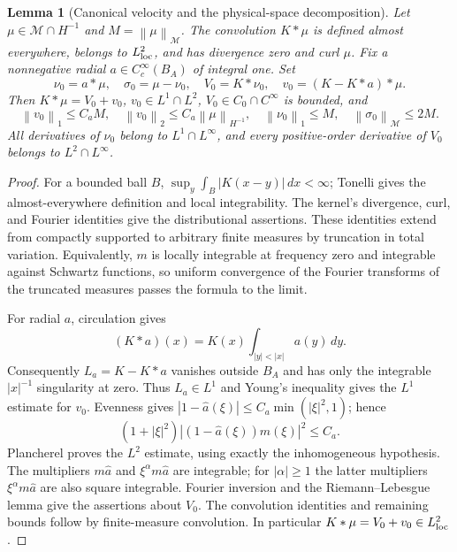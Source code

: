 \documentclass[11pt]{article}
\newtheorem{lemma}[theorem]{Lemma}
\theoremstyle{remark}\newtheorem{remark}[theorem]{Remark}
\newcommand{\M}{\mathcal M}
\newcommand{\norm}[2]{\left\|#1\right\|_{#2}}
\newcommand{\dd}{\,dx}
\begin{document}
\begin{lemma}[Canonical velocity and the physical-space decomposition]\label{lem:decomp}
Let $\mu\in\M\cap H^{-1}$ and $M=\norm\mu\M$. The convolution $K*\mu$
is defined almost everywhere, belongs to $L^2_{\rm loc}$, and has divergence
zero and curl $\mu$. Fix a nonnegative radial $a\in C_c^\infty(B_A)$ of
integral one. Set
\[
 \nu_0=a*\mu,\quad \sigma_0=\mu-\nu_0,\quad
 V_0=K*\nu_0,\quad v_0=(K-K*a)*\mu.
\]
Then $K*\mu=V_0+v_0$, $v_0\in L^1\cap L^2$, $V_0\in C_0\cap C^\infty$
is bounded, and
\[
 \norm{v_0}1\leq C_aM,\quad
 \norm{v_0}2\leq C_a\norm\mu{H^{-1}},\quad
 \norm{\nu_0}1\leq M,\quad \norm{\sigma_0}\M\leq2M.
\]
All derivatives of $\nu_0$ belong to $L^1\cap L^\infty$, and every
positive-order derivative of $V_0$ belongs to $L^2\cap L^\infty$.
\end{lemma}
\begin{proof}
For a bounded ball $B$, $\sup_y\int_B|K(x-y)|\dd<\infty$; Tonelli gives the
almost-everywhere definition and local integrability. The kernel's divergence,
curl, and Fourier identities give the distributional assertions. These identities
extend from compactly supported to arbitrary finite measures by truncation in
total variation. Equivalently, $m$ is locally integrable at frequency zero and
integrable against Schwartz functions, so uniform convergence of the Fourier
transforms of the truncated measures passes the formula to the limit.

For radial $a$, circulation gives
\[
 (K*a)(x)=K(x)\int_{|y|<|x|}a(y)\,dy.
\]
Consequently $L_a=K-K*a$ vanishes outside $B_A$ and has only the integrable
$|x|^{-1}$ singularity at zero. Thus $L_a\in L^1$ and Young's inequality gives
the $L^1$ estimate for $v_0$. Evenness gives
$|1-\widehat a(\xi)|\leq C_a\min(|\xi|^2,1)$; hence
\[
 (1+|\xi|^2)|(1-\widehat a(\xi))m(\xi)|^2\leq C_a.
\]
Plancherel proves the $L^2$ estimate, using exactly the inhomogeneous hypothesis.
The multipliers $m\widehat a$ and $\xi^\alpha m\widehat a$ are integrable;
for $|\alpha|\geq1$ the latter multipliers $\xi^\alpha m\widehat a$ are also square integrable. Fourier inversion and the
Riemann--Lebesgue lemma give the assertions about $V_0$. The convolution
identities and remaining bounds follow by finite-measure convolution. In
particular $K*\mu=V_0+v_0\in L^2_{\rm loc}$.
\end{proof}
\end{document}
